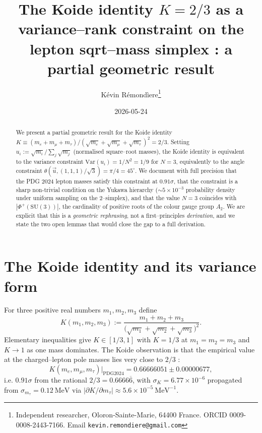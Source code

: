 \documentclass[11pt,a4paper]{article}
\title{The Koide identity $K = 2/3$ as a variance--rank constraint on the lepton sqrt--mass simplex : a partial geometric result}
\author{K\'evin R\'emond\`iere\thanks{Independent researcher, Oloron-Sainte-Marie, 64400 France. ORCID 0009-0008-2443-7166. Email \texttt{kevin.remondiere@gmail.com}}}
\date{2026-05-24}
\theoremstyle{remark}
\begin{document}
\maketitle

\begin{abstract}
We present a partial geometric result for the Koide identity $K \equiv (m_e + m_\mu + m_\tau)/(\sqrt{m_e}+\sqrt{m_\mu}+\sqrt{m_\tau})^2 = 2/3$. Setting $u_i := \sqrt{m_i}/\sum_j\sqrt{m_j}$ (normalised square--root masses), the Koide identity is equivalent to the variance constraint $\mathrm{Var}(u_i) = 1/N^2 = 1/9$ for $N = 3$, equivalently to the angle constraint $\theta(\vec u, (1,1,1)/\sqrt 3) = \pi/4 = 45^\circ$. We document with full precision that the PDG 2024 lepton masses satisfy this constraint at $0.91\sigma$, that the constraint is a sharp non-trivial condition on the Yukawa hierarchy ($\sim 5 \times 10^{-3}$ probability density under uniform sampling on the 2--simplex), and that the value $N = 3$ coincides with $|\Phi^+(\mathrm{SU}(3))|$, the cardinality of positive roots of the colour gauge group $A_2$. We are explicit that this is a \emph{geometric rephrasing}, not a first--principles \emph{derivation}, and we state the two open lemmas that would close the gap to a full derivation.
\end{abstract}

\section{The Koide identity and its variance form}

For three positive real numbers $m_1, m_2, m_3$ define
\begin{equation}
K(m_1, m_2, m_3) := \frac{m_1 + m_2 + m_3}{\big(\sqrt{m_1} + \sqrt{m_2} + \sqrt{m_3}\big)^2}.
\label{eq:Koide-def}
\end{equation}
Elementary inequalities give $K \in [1/3, 1]$ with $K = 1/3$ at $m_1 = m_2 = m_3$ and $K \to 1$ as one mass dominates. The Koide observation \cite{Koide1983} is that the empirical value at the charged--lepton pole masses lies very close to $2/3$ :
\begin{equation}
K(m_e, m_\mu, m_\tau)\big|_{\mathrm{PDG 2024}} = 0.66666051 \pm 0.00000677,
\label{eq:K-PDG}
\end{equation}
i.e. $0.91\sigma$ from the rational $2/3 = 0.6666\overline{6}$, with $\sigma_K = 6.77 \times 10^{-6}$ propagated from $\sigma_{m_\tau} = 0.12~\mathrm{MeV}$ via $|\partial K/\partial m_\tau| \approx 5.6 \times 10^{-5}~\mathrm{MeV}^{-1}$.
\end{document}
